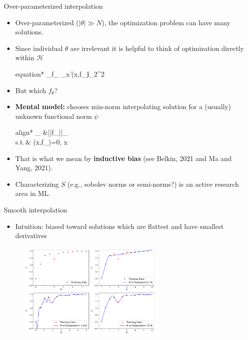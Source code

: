 \documentclass[aspectratio=169,10pt]{beamer}
\newcommand{\emphcolor}[1]{\textbf{\textcolor{emphcolorval}{#1}}}
\newcommand{\st}{\textrm{s.t.}\,}
\begin{document}
\begin{frame}{Over-parameterized interpolation}
	\begin{itemize}
		\item Over-parameterized ($|\theta|\gg N$), the optimization problem can have many solutions.
		\item Since individual $\theta$ are irrelevant it is helpful to think of optimization directly within $\mathcal{H}$
		\vspace{-0.025in}
		\begin{empheq}[box=\tcbhighmath]{equation*}
			\min_{f_{\theta} \in {}} \sum_{x \in {}} \|\ell(x,f_{\theta})\|_2^2\label{eq:functional-optimization}
		\end{empheq}
		\vspace{-0.025in}
	\item But which $f_{\theta}$?
	\item \emphcolor{Mental model:} chooses min-norm interpolating solution for a (usually) unknown functional norm $\psi$
			\vspace{-0.025in}
	\begin{empheq}[box=\tcbhighmath]{align*}
		\min_{\in {}} &||f_\theta||_\psi\\
		\st & \ell(x,f_\theta)=0,\quad {} x \in {}
	\end{empheq}
	\vspace{-0.025in}
	\item That is what we mean by \emphcolor{inductive bias} (see Belkin, 2021 and Ma and Yang, 2021).
	
	\item  Characterizing $S$ (e.g., sobolev norms or semi-norms?) is an active research area in ML.
	\end{itemize}
\end{frame}

\begin{frame}{Smooth interpolation}
	\begin{itemize}
		\item Intuition: biased toward solutions which are flattest and have smallest derivatives
	\end{itemize}
		\begin{figure}[t!]
		\centering
		\includegraphics[width=0.65\textwidth]{figs/smooth_interpolation.pdf}
	\end{figure}
\end{frame}
\end{document}
